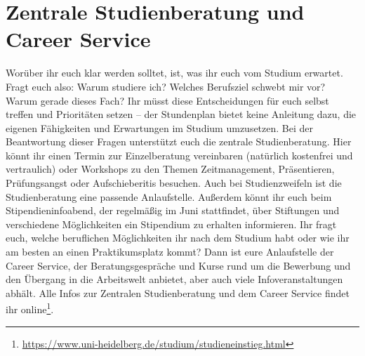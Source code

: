 \section[Zentrale Studienberatung und Career Service]{Zentrale Studienberatung und \\Career Service}
Worüber ihr euch klar werden solltet, ist, was ihr euch vom Studium erwartet. Fragt euch also: Warum studiere ich? Welches Berufsziel schwebt mir vor? Warum gerade dieses Fach? Ihr müsst diese Entscheidungen für euch selbst treffen und Prioritäten setzen – der Stundenplan bietet keine Anleitung dazu, die eigenen Fähigkeiten und Erwartungen im Studium umzusetzen. Bei der Beantwortung dieser Fragen unterstützt euch die zentrale Studienberatung. Hier könnt ihr einen Termin zur Einzelberatung vereinbaren (natürlich kostenfrei und vertraulich) oder Workshops zu den Themen Zeitmanagement, Präsentieren, Prüfungsangst oder Aufschieberitis besuchen. Auch bei Studienzweifeln ist die Studienberatung eine passende Anlaufstelle. Außerdem könnt ihr euch beim Stipendieninfoabend, der regelmäßig im Juni stattfindet, über Stiftungen und verschiedene Möglichkeiten ein Stipendium zu erhalten informieren.
Ihr fragt euch, welche beruflichen Möglichkeiten ihr nach dem Studium habt oder wie ihr am besten an einen Praktikumsplatz kommt? Dann ist eure Anlaufstelle der Career Service, der Beratungsgespräche und Kurse rund um die Bewerbung und den Übergang in die Arbeitswelt anbietet, aber auch viele Infoveranstaltungen abhält. 
Alle Infos zur Zentralen Studienberatung und dem Career Service findet ihr online\footnote{\url{https://www.uni-heidelberg.de/studium/studieneinstieg.html}}.
